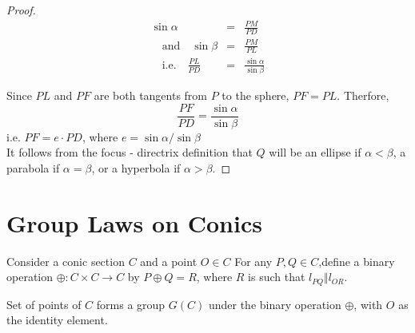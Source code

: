 \begin{proof}
  \begin{eqnarray*}
    \sin{\alpha}&=&\frac{PM}{PD}\\ 
    \quad \textrm{and} \quad \sin{\beta}&=&\frac{PM}{PL}\\
    \quad \textrm{i.e.} \quad \frac{PL}{PD}&=&\frac{\sin{\alpha}}{\sin{\beta}}
  \end{eqnarray*}
 
  Since $PL$ and $PF$ are both tangents from $P$ to the sphere, $PF=PL$. Therfore, \[\frac{PF}{PD}=\frac{\sin{\alpha}}{\sin{\beta}}\]
  i.e. $PF=e\cdot PD$, where $e=\sin{\alpha}/\sin{\beta}$\\
  It follows from the focus - directrix definition that $Q$ will be an ellipse if $\alpha<\beta$,
  a parabola if $\alpha=\beta$, or a hyperbola if $\alpha>\beta$.
\end{proof}

\section{Group Laws on Conics}

Consider a conic section $C$ and a point $O \in C$ For any $P,Q \in C$,define a binary operation
$\oplus :C \times C \rightarrow C$ by $P \oplus Q = R$, where $R$ is such that $l_{PQ} \Vert l_{OR}$.

\begin{theorem*}
Set of points of $C$ forms a group $G(C)$ under the binary operation $\oplus$, with $O$ as the identity element.
\end{theorem*}

